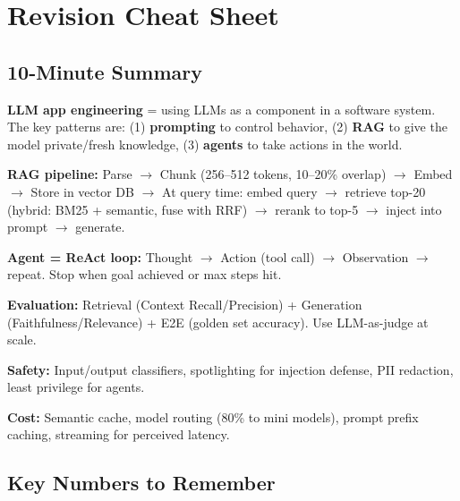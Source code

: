 \documentclass[11pt]{article}
\begin{document}
\section{Revision Cheat Sheet}\label{revision-cheat-sheet}

\subsection{10-Minute Summary}\label{10-minute-summary}

\textbf{LLM app engineering} = using LLMs as a component in a software system. The key patterns are: (1) \textbf{prompting} to control behavior, (2) \textbf{RAG} to give the model private/fresh knowledge, (3) \textbf{agents} to take actions in the world.

\textbf{RAG pipeline:} Parse \(\rightarrow\) Chunk (256--512 tokens, 10--20\% overlap) \(\rightarrow\) Embed \(\rightarrow\) Store in vector DB \(\rightarrow\) At query time: embed query \(\rightarrow\) retrieve top-20 (hybrid: BM25 + semantic, fuse with RRF) \(\rightarrow\) rerank to top-5 \(\rightarrow\) inject into prompt \(\rightarrow\) generate.

\textbf{Agent = ReAct loop:} Thought \(\rightarrow\) Action (tool call) \(\rightarrow\) Observation \(\rightarrow\) repeat. Stop when goal achieved or max steps hit.

\textbf{Evaluation:} Retrieval (Context Recall/Precision) + Generation (Faithfulness/Relevance) + E2E (golden set accuracy). Use LLM-as-judge at scale.

\textbf{Safety:} Input/output classifiers, spotlighting for injection defense, PII redaction, least privilege for agents.

\textbf{Cost:} Semantic cache, model routing (80\% to mini models), prompt prefix caching, streaming for perceived latency.

\subsection{Key Numbers to Remember}\label{key-numbers-to-remember}
\end{document}
